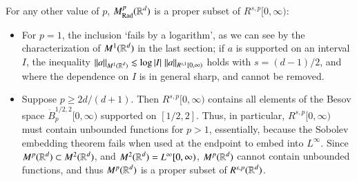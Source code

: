 For any other value of $p$, $M^p_{\text{Rad}}(\operatorname{\mathbb{R}}^d)$ is a proper subset of $R^{s,p}[0,\infty)$:
%
\begin{itemize}
  \item For $p = 1$, the inclusion `fails by a logarithm', as we can see by the characterization of $M^1(\operatorname{\mathbb{R}}^d)$ in the last section; if $a$ is supported on an interval $I$, the inequality $\| a \|_{M^1(\operatorname{\mathbb{R}}^d)} \lesssim \log |I|\; \| a \|_{R^{s,1}[0,\infty)}$ holds with $s = (d-1)/2$, and where the dependence on $I$ is in general sharp, and cannot be removed.

  \item Suppose $p \geq 2d/(d+1)$. Then $R^{s,p}[0,\infty)$ contains all elements of the Besov space $\dot{B}^{{1/2},2}_p[0,\infty)$ supported on $[1/2,2]$. Thus, in particular, $R^{s,p}[0,\infty)$ must contain unbounded functions for $p > 1$, essentially, because the Sobolev embedding theorem fails when used at the endpoint to embed into $L^\infty$. Since $M^p(\operatorname{\mathbb{R}}^d) \subset M^2(\operatorname{\mathbb{R}}^d)$, and $M^2(\operatorname{\mathbb{R}}^d) = L^\infty[0,\infty)$, $M^p(\operatorname{\mathbb{R}}^d)$ cannot contain unbounded functions, and thus $M^p(\operatorname{\mathbb{R}}^d)$ is a proper subset of $R^{s,p}(\operatorname{\mathbb{R}}^d)$.








\end{itemize}
